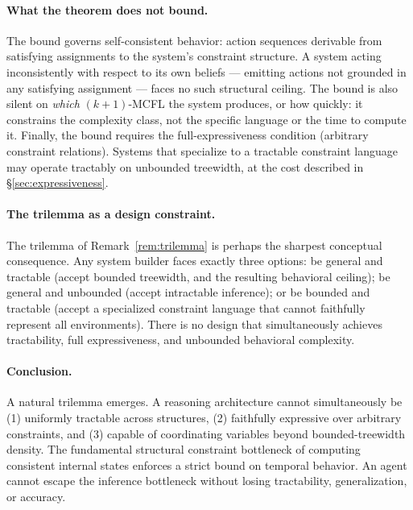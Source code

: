 \documentclass[11pt,a4paper]{article}
\theoremstyle{plain}
\theoremstyle{definition}
\theoremstyle{remark}
\begin{document}
\paragraph{What the theorem does not bound.}
The bound governs self-consistent behavior: action sequences derivable from satisfying assignments to the system's constraint structure.
A system acting inconsistently with respect to its own beliefs --- emitting actions not grounded in any satisfying assignment --- faces no such structural ceiling.
The bound is also silent on \emph{which} $(k{+}1)$-MCFL the system produces, or how quickly: it constrains the complexity class, not the specific language or the time to compute it.
Finally, the bound requires the full-expressiveness condition (arbitrary constraint relations).
Systems that specialize to a tractable constraint language may operate tractably on unbounded treewidth, at the cost described in \S\ref{sec:expressiveness}.

\paragraph{The trilemma as a design constraint.}
The trilemma of Remark~\ref{rem:trilemma} is perhaps the sharpest conceptual consequence.
Any system builder faces exactly three options: be general and tractable (accept bounded treewidth, and the resulting behavioral ceiling); be general and unbounded (accept intractable inference); or be bounded and tractable (accept a specialized constraint language that cannot faithfully represent all environments).
There is no design that simultaneously achieves tractability, full expressiveness, and unbounded behavioral complexity.

\paragraph{Conclusion.}
A natural trilemma emerges. A reasoning architecture cannot simultaneously be (1) uniformly tractable across structures, (2) faithfully expressive over arbitrary constraints, and (3) capable of coordinating variables beyond bounded-treewidth density. The fundamental structural constraint bottleneck of computing consistent internal states enforces a strict bound on temporal behavior. An agent cannot escape the inference bottleneck without losing tractability, generalization, or accuracy.
\end{document}
